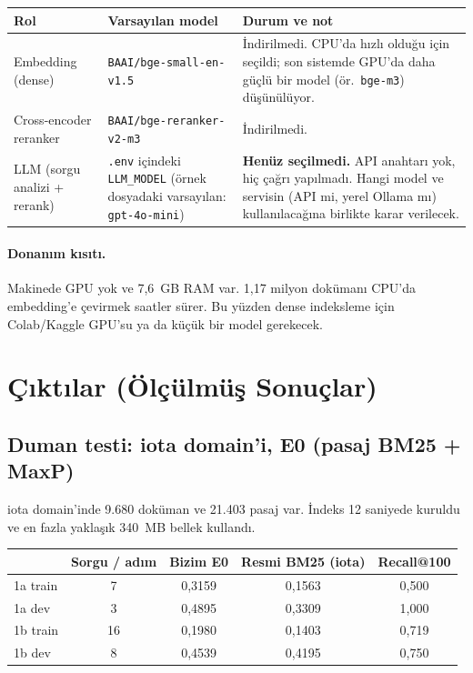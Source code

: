 \documentclass[11pt,a4paper]{article}
\begin{document}
\medskip
\noindent\begin{tabularx}{\textwidth}{>{\raggedright\arraybackslash}p{2.9cm} >{\raggedright\arraybackslash}p{5.0cm} L}
\toprule
\textbf{Rol} & \textbf{Varsayılan model} & \textbf{Durum ve not} \\
\midrule
Embedding (dense) & \texttt{BAAI/bge-small-en-v1.5} & İndirilmedi. CPU'da hızlı olduğu için
  seçildi; son sistemde GPU'da daha güçlü bir model (ör.\ \texttt{bge-m3}) düşünülüyor. \\
Cross-encoder reranker & \texttt{BAAI/bge-reranker-v2-m3} & İndirilmedi. \\
LLM (sorgu analizi + rerank) & \texttt{.env} içindeki \texttt{LLM\_MODEL} (örnek dosyadaki
  varsayılan: \texttt{gpt-4o-mini}) & \textbf{Henüz seçilmedi.} API anahtarı yok, hiç çağrı
  yapılmadı. Hangi model ve servisin (API mi, yerel Ollama mı) kullanılacağına birlikte karar
  verilecek. \\
\bottomrule
\end{tabularx}

\paragraph{Donanım kısıtı.} Makinede GPU yok ve 7,6~GB RAM var. 1,17 milyon dokümanı CPU'da
embedding'e çevirmek saatler sürer. Bu yüzden dense indeksleme için Colab/Kaggle GPU'su ya da
küçük bir model gerekecek.

\section{Çıktılar (Ölçülmüş Sonuçlar)}

\subsection{Duman testi: iota domain'i, E0 (pasaj BM25 + MaxP)}
iota domain'inde 9.680 doküman ve 21.403 pasaj var. İndeks 12 saniyede kuruldu ve en fazla
yaklaşık 340~MB bellek kullandı.

\begin{center}
\begin{tabular}{lcccc}
\toprule
& \textbf{Sorgu / adım} & \textbf{Bizim E0} & \textbf{Resmi BM25 (iota)} & \textbf{Recall@100} \\
\midrule
1a train & 7  & 0,3159 & 0,1563 & 0,500 \\
1a dev   & 3  & 0,4895 & 0,3309 & 1,000 \\
1b train & 16 & 0,1980 & 0,1403 & 0,719 \\
1b dev   & 8  & 0,4539 & 0,4195 & 0,750 \\
\bottomrule
\end{tabular}
\end{center}
\end{document}
